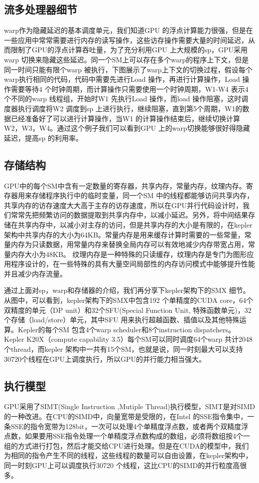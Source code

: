 \subsection{流多处理器细节}
warp作为隐藏延迟的基本调度单元，我们知道GPU 的浮点计算能力很强，但是在一些应用中常常需要进行内存的读写操作，这些访存操作需要大量的时间延迟，从而限制了GPU的浮点计算吞吐量，为了充分利用GPU 上大规模的sp，GPU采用warp 切换来隐藏这些延迟。同一个SM上可以存在多个warp的程序上下文，但是同一时间只能有限个warp 被执行，下图展示了warp上下文的切换过程，假设每个warp执行相同的代码，代码中需要先进行Load 操作，再进行计算操作，Load 操作需要等待4 个时钟周期，而计算操作只需要使用一个时钟周期，W1-W4 表示4个不同的warp 线程组，开始时W1 先执行Load 操作，而load 操作阻塞，这时调度器执行调度将W2 调度到sp 上进行执行，继续阻塞，直到第5个周期，W1的数据已经准备好了可以进行计算操作，当W1 的计算操作结束后，继续切换计算W2，W3，W4。通过这个例子我们可以看到GPU 上的warp切换能够很好得隐藏延迟，提高sp 的利用率。

\subsection{存储结构}
GPU中的每个SM中含有一定数量的寄存器，共享内存，常量内存，纹理内存。寄存器用来存储程序执行中的临时变量，同一个SM 中的线程都能够访问共享内存，共享内存的访存速度大大高于主存的访存速度，所以在GPU并行代码设计时，我们常常先把频繁访问的数据提取到共享内存中，以减小延迟。另外，将中间结果存储在共享内存中，以减小对主存的访问，但是共享内存的大小是有限的，在kepler架构中共享内存的大小为64KB。常量内存是用来缓存计算时需要的一些常量，常量内存为只读数据，用常量内存来替换全局内存可以有效地减少内存带宽占用，常量内存大小为48KB。 纹理内存是一种特殊的只读缓存，纹理内存是专门为图形应用程序设计的，在一些特殊的具有大量空间局部性的内存访问模式中能够提升性能并且减少内存流量。

通过上面对sp，warp和存储器的介绍，我们再分享下kepler架构下的SMX 细节。从图中，可以看到，kepler架构下的SMX中包含192 个单精度的CUDA core，64个双精度的单元（DP unit）和32个SFU(Special Function Unit, 特殊函数单元)，32个存储（load/store）单元，其中SFU 用来执行超越函数、插值以及其他特殊运算。Kepler的每个SM 包含4个warp scheduler和8个instruction dispatchers。 Kepler K20X（compute capability 3.5）每个SM可以同时调度64个warp 共计2048个thread，而kepler 架构中一共有15个SM，也就是说，同一时刻最大可以支持30720个线程在GPU上调度执行，所以GPU的并行能力相当强大。

\subsection{执行模型}
GPU采用了SIMT(Single Instruction ,Mutiple Thread)执行模型，SIMT是对SIMD的一种改进。在CPU的SIMD中，向量宽带是受限的，在Intel 的SSE指令集中，一条SSE的指令宽带为128bit，一次可以处理4个单精度浮点数，或者两个双精度浮点数，如果要用SSE指令处理一个单精度浮点数构成的数组，必须将数组按4个一组的方式进行打包，然后才能交给CPU进行处理。但是在CUDA的模型中，我们为相同的指令产生不同的线程，这些线程的数量可以自由设置，在kepler架构中，同一时刻GPU上可以调度执行30720 个线程，这比CPU的SIMD的并行粒度高很多。



